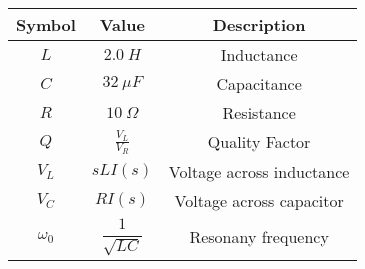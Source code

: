 

\begin{tabular}{|c|c|c|}
    \hline
     \textbf{Symbol} & \textbf{Value} &
     \textbf{Description}\\
    \hline
     $L$ &  $2.0\ H$ & Inductance\\[6pt]
    \hline 
     $C$ &  $32\ \mu F$ & Capacitance \\[6pt]
    \hline
     $R$ &  $10\ \Omega$ & Resistance\\[6pt]
    \hline
     $Q$ & $\frac{V_L}{V_R}$ & Quality Factor\\[6pt]
    \hline
    $V_L$ & $sLI(s)$ & Voltage across inductance\\[6pt]
    \hline
    $V_C$ & $RI(s)$ & Voltage across capacitor\\[6pt]
    \hline
    $\omega_0$ & $\dfrac{1}{\sqrt{LC}}$ & Resonany frequency\\[6pt]
    \hline
\end{tabular}
